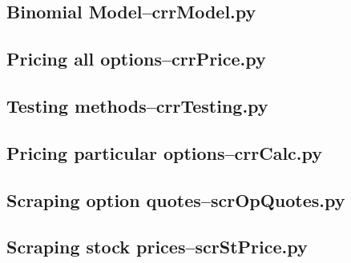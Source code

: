\appendix
\subsection{Binomial Model--crrModel.py}

\subsection{Pricing all options--crrPrice.py}

\subsection{Testing methods--crrTesting.py}

\subsection{Pricing particular options--crrCalc.py}

\subsection{Scraping option quotes--scrOpQuotes.py}

\subsection{Scraping stock prices--scrStPrice.py}

